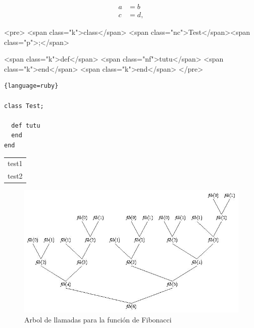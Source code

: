 \documentclass[12pt]{article}
\begin{document}
\begin{align}
a & = b \\
c &= d,
\end{align}
\begin{rawhtml}
<pre>
<span class="k">class</span> <span class="nc">Test</span><span class="p">;</span> 

  <span class="k">def</span> <span class="nf">tutu</span>
  <span class="k">end</span>
<span class="k">end</span>
</pre>

\end{rawhtml}
\begin{latexonly}
\begin{lstlisting}{language=ruby}

class Test; 

  def tutu
  end
end

\end{lstlisting}
\end{latexonly}
\begin{tabular}{|c|}
\hline

    test1\\
    test2\\
    
\hline
\end{tabular}


\begin{figure}[htb]
\begin{center}
\includegraphics[scale=0.7]{examples/fibonacci.png}
\end{center}
\label{figure:fibonacci}
\caption{Arbol de llamadas para la función de Fibonacci}
\end{figure}
\end{document}
